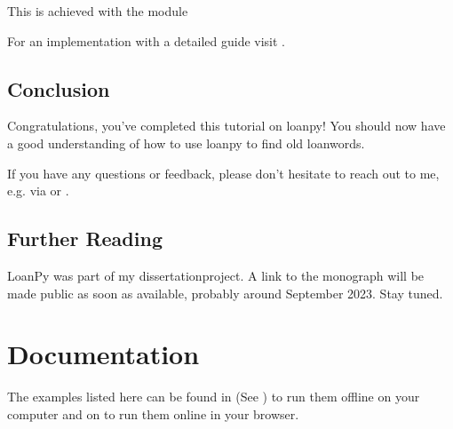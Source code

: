 \documentclass[letterpaper,10pt,english]{sphinxmanual}
\begin{document}
\sphinxAtStartPar
This is achieved with the 
module

\sphinxAtStartPar
For an implementation with a detailed guide visit
.


\section{Conclusion}
\label{\detokenize{tutorial:conclusion}}
\sphinxAtStartPar
Congratulations, you’ve completed this tutorial on loanpy! You should now
have a good understanding of how to use loanpy to find old loanwords.

\sphinxAtStartPar
If you have any questions or feedback, please don’t hesitate to reach out
to me, e.g. via  or
.


\section{Further Reading}
\label{\detokenize{tutorial:further-reading}}
\sphinxAtStartPar
LoanPy was part of my dissertation\sphinxhyphen{}project.
A link to the monograph will be made public as soon as available,
probably around September 2023. Stay tuned.

\sphinxstepscope


\chapter{Documentation}
\label{\detokenize{documentation:documentation}}\label{\detokenize{documentation::doc}}
\sphinxAtStartPar
The examples listed here can be found in
 (See
)
to run them offline on your computer and on
to run them online in your browser.
\end{document}
